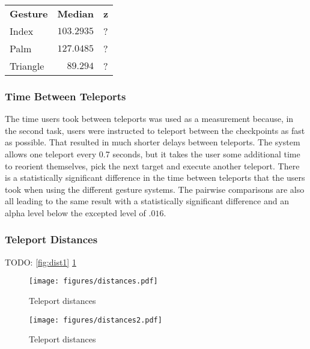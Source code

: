 \begin{table}[]
\begin{tabular}{lrl}
    \textbf{Gesture} & \multicolumn{1}{l}{\textbf{Median}} & \textbf{z} \\
    Index            & $103.2935$                            & ?      \\
    Palm             & $127.0485$                            & ?      \\
    Triangle         & $89.294$                              & ?     
    \label{tbl:taskCompletionTime}
\end{tabular}
\end{table}

\subsubsection{Time Between Teleports}
The time users took between teleports was used as a measurement because, in the second task, users were instructed to teleport between the checkpoints as fast as possible. That resulted in much shorter delays between teleports. The system allows one teleport every 0.7 seconds, but it takes the user some additional time to reorient themselves, pick the next target and execute another teleport. There is a statistically significant difference in the time between teleports that the users took when using the different gesture systems. The pairwise comparisons are also all leading to the same result with a statistically significant difference and an alpha level below the excepted level of $.016$. 

\subsubsection{Teleport Distances}
TODO: \ref{fig:dist1} \ref{fig:dist2}

\begin{figure}[!htb]
        \texttt{[image: figures/distances.pdf]}
        \caption{Teleport distances}
        \label{fig:dist1}
    \endminipage\hfill
        \texttt{[image: figures/distances2.pdf]}
        \caption{Teleport distances}
        \label{fig:dist2}
    \endminipage\hfill
\end{figure}



